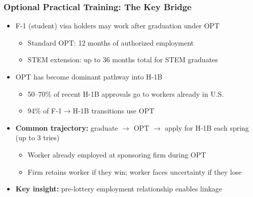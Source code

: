 \documentclass[xcolor=dvipsnames, compress, 12pt, aspectratio=169, presentation]{beamer}
\begin{document}
\begin{frame}
    \frametitle{Optional Practical Training: The Key Bridge}
    \begin{itemize}
        \item F-1 (student) visa holders may work after graduation under OPT
        \begin{itemize}
            \item Standard OPT: 12 months of authorized employment
            \item STEM extension: up to 36 months total for STEM graduates
        \end{itemize}
        \vspace{3mm}
        \item OPT has become dominant pathway into H-1B
        \begin{itemize}
            \item 50--70\% of recent H-1B approvals go to workers already in U.S.
            \item 94\% of F-1$\rightarrow$H-1B transitions use OPT
        \end{itemize}
        \vspace{3mm}
        \item \textbf{Common trajectory:} graduate $\rightarrow$ OPT $\rightarrow$ apply for H-1B each spring (up to 3 tries)
        \begin{itemize}
            \item Worker already employed at sponsoring firm during OPT
            \item Firm retains worker if they win; worker faces uncertainty if they lose
        \end{itemize}
        \vspace{3mm}
        \item \textcolor{maincolor}{\textbf{Key insight:}} pre-lottery employment relationship enables linkage
    \end{itemize}
\end{frame}
\end{document}
